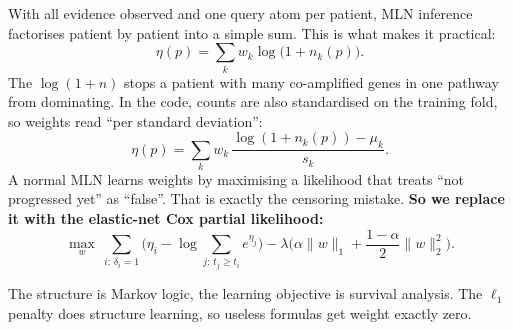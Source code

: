 \documentclass[11pt,a4paper]{article}
\begin{document}
With all evidence observed and one query atom per patient, MLN inference factorises patient by patient into a simple sum. This is what makes it practical:
\begin{equation}
\eta(p)=\sum_k w_k\log\big(1+n_k(p)\big).
\end{equation}
The $\log(1+n)$ stops a patient with many co-amplified genes in one pathway from dominating. In the code, counts are also standardised on the training fold, so weights read ``per standard deviation'':
\begin{equation}
\eta(p)=\sum_k w_k\,\frac{\log(1+n_k(p))-\mu_k}{s_k}.
\end{equation}
A normal MLN learns weights by maximising a likelihood that treats ``not progressed yet'' as ``false''. That is exactly the censoring mistake. \textbf{So we replace it with the elastic-net Cox partial likelihood:}
\begin{equation}
\max_{w}\ \sum_{i:\,\delta_i=1}\Big(\eta_i-\log\!\sum_{j:\,t_j\ge t_i}e^{\eta_j}\Big)-\lambda\Big(\alpha\|w\|_1+\frac{1-\alpha}{2}\|w\|_2^2\Big).
\end{equation}
\begin{whybox}
The structure is Markov logic, the learning objective is survival analysis. The $\ell_1$ penalty does structure learning, so useless formulas get weight exactly zero.
\end{whybox}
\end{document}
